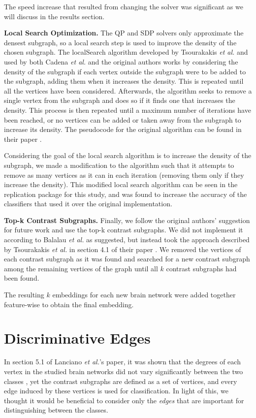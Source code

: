 \documentclass[letterpaper]{article}
\begin{document}
The speed increase that resulted from changing the solver was significant as we will discuss in the results section.

\textbf{Local Search Optimization.}
The QP and SDP solvers only approximate the densest subgraph, so a local search step is used to improve the density of the chosen subgraph.
The localSearch algorithm developed by Tsourakakis \emph{et al.} and used by both Cadena \emph{et al.} and the original authors works by considering the density of the subgraph if each vertex outside the subgraph were to be added to the subgraph, adding them when it increases the density.
This is repeated until all the vertices have been considered.
Afterwards, the algorithm seeks to remove a single vertex from the subgraph and does so if it finds one that increases the density.
This process is then repeated until a maximum number of iterations have been reached, or no vertices can be added or taken away from the subgraph to increase its density.
The pseudocode for the original algorithm can be found in their paper \cite{tsourakakis2013}.

Considering the goal of the local search algorithm is to increase the density of the subgraph, we made a modification to the algorithm such that it attempts to remove as many vertices as it can in each iteration (removing them only if they increase the density).
This modified local search algorithm can be seen in the replication package for this study, and was found to increase the accuracy of the classifiers that used it over the original implementation.

\textbf{Top-k Contrast Subgraphs.}
Finally, we follow the original authors' suggestion for future work and use the top-k contrast subgraphs.
We did not implement it according to Balalau \emph{et al.} \cite{balalau2015} as suggested, but instead took the approach described by Tsourakakis \emph{et al.} in section 4.1 of their paper \cite{tsourakakis2013}.
We removed the vertices of each contrast subgraph as it was found and searched for a new contrast subgraph among the remaining vertices of the graph until all $k$ contrast subgraphs had been found.

The resulting $k$ embeddings for each new brain network were added together feature-wise to obtain the final embedding.



\section{Discriminative Edges}
In section 5.1 of Lanciano \emph{et al.}'s paper, it was shown that the degrees of each vertex in the studied brain networks did not vary significantly between the two classes \cite{lanciano2020}, yet the contrast subgraphs are defined as a set of vertices, and every edge induced by these vertices is used for classification.
In light of this, we thought it would be beneficial to consider only the \emph{edges} that are important for distinguishing between the classes.
\end{document}
